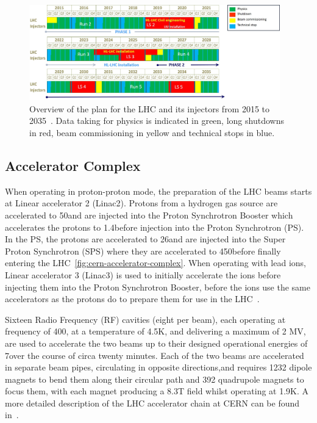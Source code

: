 \begin{figure}[htbp]
\begin{center}
\includegraphics[width=0.97\textwidth]{figs/lhc/LHC-Planning.jpg}
\caption{Overview of the plan for the LHC and its injectors from 2015 to 2035~\cite{P2TrackerTDR}. Data taking for physics is indicated in green, long shutdowns in red, beam commissioning in yellow and technical stops in blue.}
\label{fig:lhc-planning}
\end{center}
\end{figure}

\subsection{Accelerator Complex}
When operating in proton-proton mode, the preparation of the LHC beams starts at Linear accelerator 2 (Linac2). 
Protons from a hydrogen gas source are accelerated to 50\MeV and are injected into the Proton Synchrotron Booster which accelerates the protons to 1.4\GeV before injection into the Proton Synchrotron (PS). 
In the PS, the protons are accelerated to 26\GeV and are injected into the Super Proton Synchrotron (SPS) where they are accelerated to 450\GeV before finally entering the LHC~\ref{fig:cern-accelerator-complex}. 
When operating with lead ions, Linear accelerator 3 (Linac3) is used to initially accelerate the ions before injecting them into the Proton Synchrotron Booster, before the ions use the same accelerators as the protons do to prepare them for use in the LHC~\cite{Bruning:782076}. 

Sixteen Radio Frequency (RF) cavities (eight per beam), each operating at frequency of 400\MHz, at a temperature of 4.5K, and delivering a maximum of 2 MV, are used to accelerate the two beams up to their designed operational energies of 7\TeV over the course of circa twenty minutes.
Each of the two beams are accelerated in separate beam pipes, circulating in opposite directions,and requires 1232 dipole magnets to bend them along their circular path and 392 quadrupole magnets to focus them, with each magnet producing a 8.3T field whilst operating at 1.9K.
A more detailed description of the LHC accelerator chain at CERN can be found in~\cite{Schindl:397574}. 

